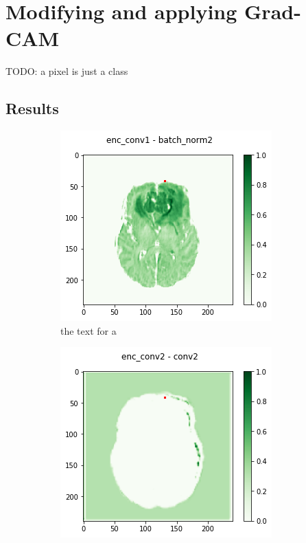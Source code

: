 \section{Modifying and applying Grad-CAM}

TODO: a pixel is just a class

\subsection{Results}

\begin{figure}[H]
    \centering
    \begin{subfigure}{.33\textwidth}
        \centering
        \includegraphics[width=\linewidth]{chapters/04_segmentation/images/grad_cam_03.png}
        \caption{ the text for a}
    \end{subfigure}%
    \begin{subfigure}{.33\textwidth}
        \centering
        \includegraphics[width=\linewidth]{chapters/04_segmentation/images/grad_cam_05.png}

\end{subfigure}
\end{figure}
